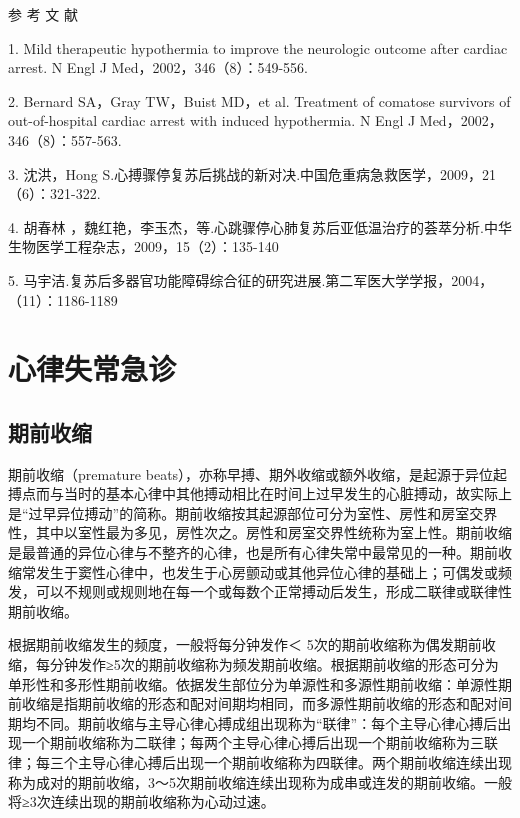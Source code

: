 \protect\hypertarget{text00287.html}{}{}

\hypertarget{text00287.htmlux5cux23CHP10-1-8}{}
参 考 文 献

1. Mild therapeutic hypothermia to improve the neurologic outcome after
cardiac arrest. N Engl J Med，2002，346（8）：549-556.

2. Bernard SA，Gray TW，Buist MD，et al. Treatment of comatose survivors
of out-of-hospital cardiac arrest with induced hypothermia. N Engl J
Med，2002，346（8）：557-563.

3. 沈洪，Hong
S.心搏骤停复苏后挑战的新对决.中国危重病急救医学，2009，21（6）：321-322.

4. 胡春林
，魏红艳，李玉杰，等.心跳骤停心肺复苏后亚低温治疗的荟萃分析.中华生物医学工程杂志，2009，15（2）：135-140

5.
马宇洁.复苏后多器官功能障碍综合征的研究进展.第二军医大学学报，2004，（11）：1186-1189

\protect\hypertarget{text00288.html}{}{}

\chapter{心律失常急诊}

\section{期前收缩}

期前收缩（premature
beats），亦称早搏、期外收缩或额外收缩，是起源于异位起搏点而与当时的基本心律中其他搏动相比在时间上过早发生的心脏搏动，故实际上是“过早异位搏动”的简称。期前收缩按其起源部位可分为室性、房性和房室交界性，其中以室性最为多见，房性次之。房性和房室交界性统称为室上性。期前收缩是最普通的异位心律与不整齐的心律，也是所有心律失常中最常见的一种。期前收缩常发生于窦性心律中，也发生于心房颤动或其他异位心律的基础上；可偶发或频发，可以不规则或规则地在每一个或每数个正常搏动后发生，形成二联律或联律性期前收缩。

根据期前收缩发生的频度，一般将每分钟发作＜
5次的期前收缩称为偶发期前收缩，每分钟发作≥5次的期前收缩称为频发期前收缩。根据期前收缩的形态可分为单形性和多形性期前收缩。依据发生部位分为单源性和多源性期前收缩：单源性期前收缩是指期前收缩的形态和配对间期均相同，而多源性期前收缩的形态和配对间期均不同。期前收缩与主导心律心搏成组出现称为“联律”：每个主导心律心搏后出现一个期前收缩称为二联律；每两个主导心律心搏后出现一个期前收缩称为三联律；每三个主导心律心搏后出现一个期前收缩称为四联律。两个期前收缩连续出现称为成对的期前收缩，3～5次期前收缩连续出现称为成串或连发的期前收缩。一般将≥3次连续出现的期前收缩称为心动过速。

